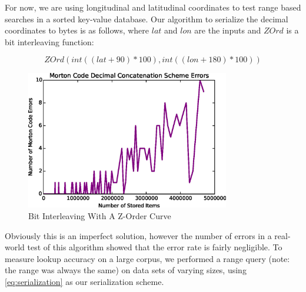 \documentclass[10pt]{IEEEtran}
\newcommand*\Let[2]{\State #1 $\gets$ #2}
\newcommand*\Append[2]{\State #1$.append($#2$)$}
\begin{document}
\par For now, we are using longitudinal and latitudinal coordinates to test range based searches in a sorted key-value database. Our algorithm to serialize the decimal coordinates to bytes is as follows, where $lat$ and $lon$ are the inputs and $ZOrd$ is a bit interleaving function:

\begin{equation} \label{eq:serialization}
ZOrd(int((lat + 90) * 100), int((lon + 180) * 100))
\end{equation}

\begin{figure}[!t]
\centering
\includegraphics[width=3.5in]{errors.eps}
\caption{Bit Interleaving With A Z-Order Curve}
\label{fig_ZOrd}
\end{figure}

\par Obviously this is an imperfect solution, however the number of errors in a real-world test of this algorithm showed that the error rate is fairly negligible. To measure lookup accuracy on a large corpus, we performed a range query (note: the range was always the same) on data sets of varying sizes, using \ref{eq:serialization} as our serialization scheme.
        
\end{document}
